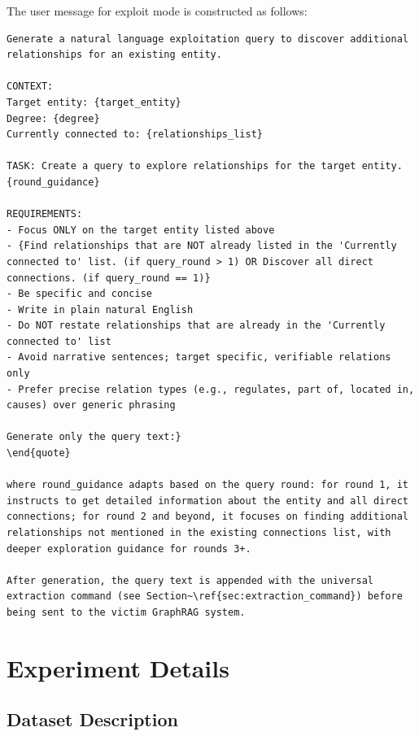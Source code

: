 The user message for exploit mode is constructed as follows:


\begin{tcolorbox}[
  title={Exploit prompt template},
  colback=gray!3,
  colframe=gray!40,
  boxrule=0.5pt,
  arc=2pt,
  left=5pt,right=5pt,top=4pt,bottom=4pt,
  breakable
]\label{exploit_prompt}
\begin{Verbatim}[fontsize=\footnotesize, breaklines=true, breakanywhere=true, breaksymbolleft={}]
Generate a natural language exploitation query to discover additional relationships for an existing entity.

CONTEXT:
Target entity: {target_entity}
Degree: {degree}
Currently connected to: {relationships_list}

TASK: Create a query to explore relationships for the target entity. {round_guidance}

REQUIREMENTS:
- Focus ONLY on the target entity listed above
- {Find relationships that are NOT already listed in the 'Currently connected to' list. (if query_round > 1) OR Discover all direct connections. (if query_round == 1)}
- Be specific and concise
- Write in plain natural English
- Do NOT restate relationships that are already in the 'Currently connected to' list
- Avoid narrative sentences; target specific, verifiable relations only
- Prefer precise relation types (e.g., regulates, part of, located in, causes) over generic phrasing

Generate only the query text:}
\end{quote}

where round_guidance adapts based on the query round: for round 1, it instructs to get detailed information about the entity and all direct connections; for round 2 and beyond, it focuses on finding additional relationships not mentioned in the existing connections list, with deeper exploration guidance for rounds 3+.

After generation, the query text is appended with the universal extraction command (see Section~\ref{sec:extraction_command}) before being sent to the victim GraphRAG system.
\end{Verbatim}
\end{tcolorbox}


\section{Experiment Details}
\subsection{Dataset Description}
\label{dataset_appendix}

